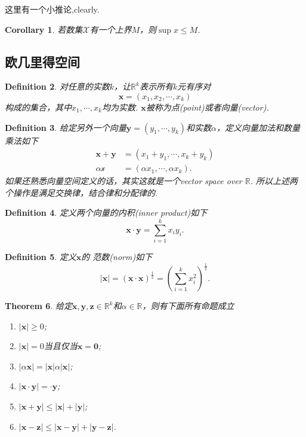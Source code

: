 \documentclass{article}
\newtheorem{theorem}{Theorem}[section]
\newtheorem{corollary}[theorem]{Corollary}
\newtheorem{definition}[theorem]{Definition}
\newcommand{\vect}[1]{\mathbf{#1}} %
\begin{document}
这里有一个小推论,clearly.

\begin{corollary}
若数集$\mathcal{X}$有一个上界$M$，则$\sup{x} \leq M$.
\end{corollary}

\newpage
\subsection{欧几里得空间}

\begin{definition}
\rm 对任意的实数$k$，让$\mathbb{R}^k$表示所有$k$元有序对
$$
\mathbf{x} = (x_1,x_2,\cdots,x_k)
$$
构成的集合，其中$x_1,\cdots,x_k$均为实数. $\mathbf{x}$被称为点(point)或者向量(vector).
\end{definition}

\begin{definition}
\rm 给定另外一个向量$\mathbf{y} = (y_1,\cdots,y_k)$和实数$\alpha$，定义向量加法和数量乘法如下
\begin{align}
\mathbf{x} +\mathbf{y} &= (x_1 + y_1 , \cdots,  x_k + y_k) \\
\alpha \mathcal{x} &= (\alpha x_1, \cdots, \alpha x_k).
\end{align}
如果还熟悉向量空间定义的话，其实这就是一个vector space over $\mathbb{R}$. 所以上述两个操作是满足交换律，结合律和分配律的.
\end{definition}

\begin{definition}
\rm 定义两个向量的{\color{red}内积(inner product)}如下
$$
\mathbf{x} \cdot \mathbf{y} = \sum\limits_{i=1}^{k}x_i y_i.
$$
\end{definition}

\begin{definition}
\rm 定义$\mathbf{x}$的 {\color{red} 范数(norm)}如下
$$
|\mathbf{x}| = (\mathbf{x} \cdot \mathbf{x})^{\frac12} = \left(\sum\limits_{i=1}^{k}x_i^2\right)^{\frac12}.
$$
\end{definition}

\begin{theorem}
\rm 给定$\mathbf{x},\mathbf{y},\mathbf{z} \in \mathbb{R}^k$和$\alpha \in \mathbb{R}$，则有下面所有命题成立
\begin{enumerate}
	\item $|\vect{x}| \geq 0$;
	\item $|\vect{x}| = 0$当且仅当$\vect{x} = \vect{0}$;
	\item $|\alpha \vect{x}| = |\vect{x}| \alpha |\vect{x}|$;
	\item $|\vect{x} \cdot \vect{y}| = \vect \cdot \vect{y}$;
	\item $|\vect{x} + \vect{y}| \leq |\vect{x}| + |\vect{y}|$;
	\item $|\vect{x} - \vect{z}| \leq |\vect{x} - \vect{y}| + |\vect{y} - \vect{z}|$.
\end{enumerate}
\end{theorem}
\end{document}
